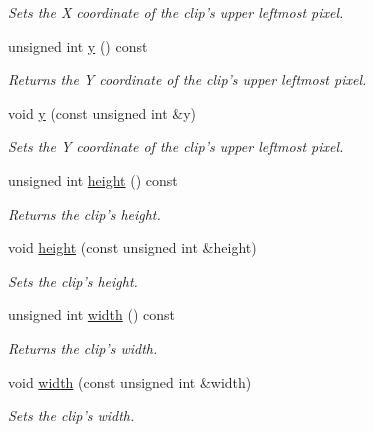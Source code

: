 \begin{CompactItemize}
\begin{CompactList}\small\item\em Sets the X coordinate of the clip's upper leftmost pixel. \item\end{CompactList}\item 
unsigned int \hyperlink{class_clip_998a62506ffab457184ec7083cb154e4}{y} () const 
\begin{CompactList}\small\item\em Returns the Y coordinate of the clip's upper leftmost pixel. \item\end{CompactList}\item 
void \hyperlink{class_clip_d80413e24272ee2174f76e80f4d35991}{y} (const unsigned int \&y)
\begin{CompactList}\small\item\em Sets the Y coordinate of the clip's upper leftmost pixel. \item\end{CompactList}\item 
unsigned int \hyperlink{class_clip_393710a6b136f400dd5c900f8831e1a8}{height} () const 
\begin{CompactList}\small\item\em Returns the clip's height. \item\end{CompactList}\item 
void \hyperlink{class_clip_f5b4598afd42e098c3811f7a82227cdd}{height} (const unsigned int \&height)
\begin{CompactList}\small\item\em Sets the clip's height. \item\end{CompactList}\item 
unsigned int \hyperlink{class_clip_d3e816599913e4051e5d50fae17ecd76}{width} () const 
\begin{CompactList}\small\item\em Returns the clip's width. \item\end{CompactList}\item 
void \hyperlink{class_clip_bfb1bc4bf1a16c05493f5d6d03ba2498}{width} (const unsigned int \&width)
\begin{CompactList}\small\item\em Sets the clip's width. \item\end{CompactList}\item 

\end{CompactItemize}

